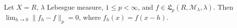 Let $X = R$, $\lambda$ Lebesgue measure, $1 \leq p < \infty$, and $f \in \mathfrak{L}_p(R, \mathcal{M}_\lambda, \lambda)$. Then $\lim_{h \to 0} \|f_h - f\|_p = 0$, where $f_h(x) = f(x - h)$.
